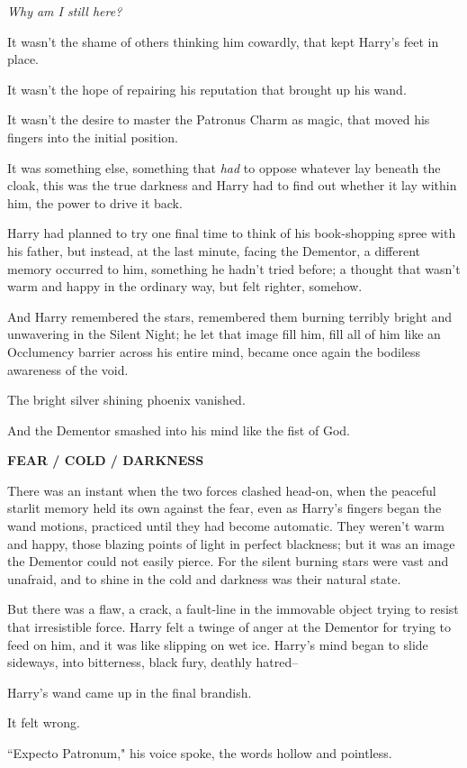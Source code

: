 \emph{Why am I still here?}

It wasn't the shame of others thinking him cowardly, that kept Harry's feet in place.

It wasn't the hope of repairing his reputation that brought up his wand.

It wasn't the desire to master the Patronus Charm as magic, that moved his fingers into the initial position.

It was something else, something that \emph{had} to oppose whatever lay beneath the cloak, this was the true darkness and Harry had to find out whether it lay within him, the power to drive it back.

Harry had planned to try one final time to think of his book-shopping spree with his father, but instead, at the last minute, facing the Dementor, a different memory occurred to him, something he hadn't tried before; a thought that wasn't warm and happy in the ordinary way, but felt righter, somehow.

And Harry remembered the stars, remembered them burning terribly bright and unwavering in the Silent Night; he let that image fill him, fill all of him like an Occlumency barrier across his entire mind, became once again the bodiless awareness of the void.

The bright silver shining phoenix vanished.

And the Dementor smashed into his mind like the fist of God.

\textbf{FEAR / COLD / DARKNESS}

There was an instant when the two forces clashed head-on, when the peaceful starlit memory held its own against the fear, even as Harry's fingers began the wand motions, practiced until they had become automatic. They weren't warm and happy, those blazing points of light in perfect blackness; but it was an image the Dementor could not easily pierce. For the silent burning stars were vast and unafraid, and to shine in the cold and darkness was their natural state.

But there was a flaw, a crack, a fault-line in the immovable object trying to resist that irresistible force. Harry felt a twinge of anger at the Dementor for trying to feed on him, and it was like slipping on wet ice. Harry's mind began to slide sideways, into bitterness, black fury, deathly hatred\---

Harry's wand came up in the final brandish.

It felt wrong.

``Expecto Patronum," his voice spoke, the words hollow and pointless.

